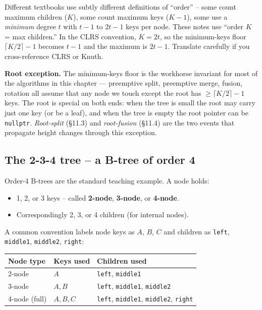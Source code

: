 \documentclass[11pt]{article}
\begin{document}
\begin{notebox}
Different textbooks use subtly different definitions of ``order'' -- some count maximum children ($K$), some count maximum keys ($K-1$), some use a \emph{minimum} degree $t$ with $t-1$ to $2t-1$ keys per node. These notes use ``order $K$ = max children.'' In the CLRS convention, $K = 2t$, so the minimum-keys floor $\lceil K/2 \rceil - 1$ becomes $t - 1$ and the maximum is $2t - 1$. Translate carefully if you cross-reference CLRS or Knuth.
\end{notebox}

\begin{notebox}
\textbf{Root exception.} The minimum-keys floor is the workhorse invariant for most of the algorithms in this chapter --- preemptive split, preemptive merge, fusion, rotation all assume that any node we touch except the root has $\ge \lceil K/2 \rceil - 1$ keys. The root is special on both ends: when the tree is small the root may carry just one key (or be a leaf), and when the tree is empty the root pointer can be \texttt{nullptr}. \emph{Root-split} (\S11.3) and \emph{root-fusion} (\S11.4) are the two events that propagate height changes through this exception.
\end{notebox}

\subsection*{The 2-3-4 tree -- a B-tree of order 4}

Order-4 B-trees are the standard teaching example. A node holds:
\begin{itemize}[leftmargin=*]
    \item 1, 2, or 3 keys -- called \textbf{2-node}, \textbf{3-node}, or \textbf{4-node}.
    \item Correspondingly 2, 3, or 4 children (for internal nodes).
\end{itemize}

A common convention labels node keys as $A$, $B$, $C$ and children as \texttt{left}, \texttt{middle1}, \texttt{middle2}, \texttt{right}:

\begin{center}
\begin{tabular}{lll}
\hline
Node type & Keys used & Children used \\
\hline
2-node & $A$ & \texttt{left}, \texttt{middle1} \\
3-node & $A, B$ & \texttt{left}, \texttt{middle1}, \texttt{middle2} \\
4-node (full) & $A, B, C$ & \texttt{left}, \texttt{middle1}, \texttt{middle2}, \texttt{right} \\
\hline
\end{tabular}
\end{center}
\end{document}
